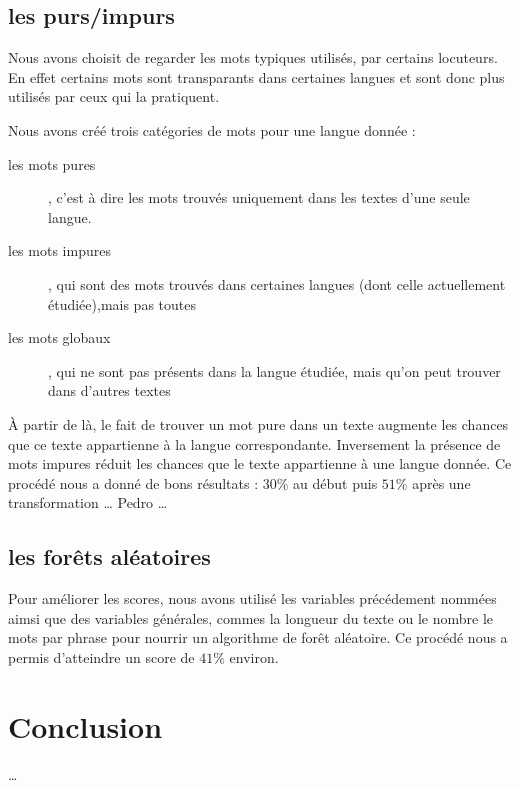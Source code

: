 \documentclass[a4paper]{article}
\begin{document}
\subsection{les purs/impurs}
Nous avons choisit de regarder les mots typiques utilisés, par
certains locuteurs. En effet certains mots sont transparants dans
certaines langues et sont donc plus utilisés par ceux qui la
pratiquent.

Nous avons créé trois catégories de mots pour une langue donnée :
\begin{description}
\item[les mots pures], c'est à dire les mots trouvés uniquement dans
  les textes d'une seule langue.
\item[les mots impures], qui sont des mots trouvés dans certaines
  langues (dont celle actuellement étudiée),mais pas toutes
\item[les mots globaux], qui ne sont pas présents dans la langue
  étudiée, mais qu'on peut trouver dans d'autres textes
\end{description}
À partir de là, le fait de trouver un mot pure dans un texte augmente
les chances que ce texte appartienne à la langue correspondante.
Inversement la présence de mots impures réduit les chances que le
texte appartienne à une langue donnée.
Ce procédé nous a donné de bons résultats : $30\%$ au début puis
$51\%$ après une transformation {\color{red}… Pedro …}

\subsection{les forêts aléatoires}
Pour améliorer les scores, nous avons utilisé les variables
précédement nommées aimsi que des variables générales, commes la
longueur du texte ou le nombre le mots par phrase pour nourrir un
algorithme de forêt aléatoire. Ce procédé nous a permis d'atteindre un
score de $41\%$ environ.
\section{Conclusion}
…
\end{document}
